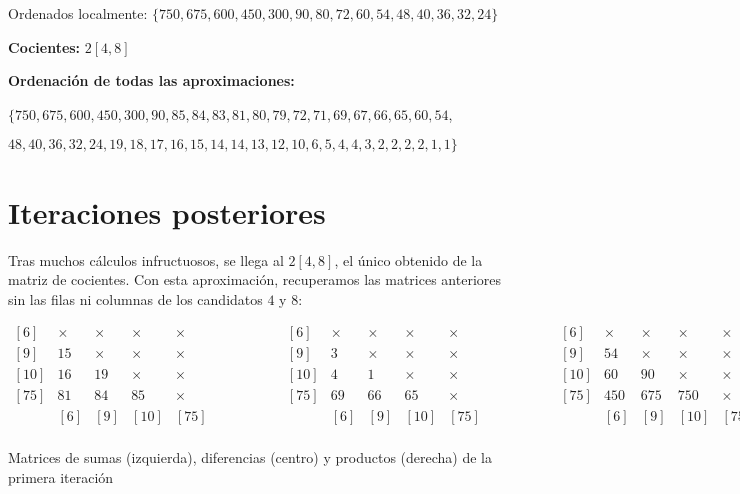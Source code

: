 Ordenados localmente: $\{750,675,600,450,300,90,80,72,60,54,48,40,36,32,24\}$

\textbf{Cocientes:} $2[4,8]$

\textbf{Ordenación de todas las aproximaciones:}

\begin{center}
$\{750,675,600,450,300,90,85,84,83,81,80,79,72,71,69,67,66,65,60,54$,

$48,40,36,32,24,19,18,17,16,15,14,14,13,12,10,6,5,4,4,3,2,2,2,2,1,1\}$
\end{center}

\section{Iteraciones posteriores}

Tras muchos cálculos infructuosos, se llega al  $2[4,8]$, el único  obtenido de la matriz de cocientes.
Con esta aproximación, recuperamos las matrices anteriores sin las filas ni columnas de los candidatos $4$ y $8$:

\begin{center}
$\begin{matrix}
[6]  & \times & \times & \times & \times \\
[9]  & 15     & \times & \times & \times \\
[10] & 16     & 19     & \times & \times \\
[75] & 81     & 84     & 85     & \times \\
     &   [6]  &   [9]  &  [10]  &  [75]  \\
\end{matrix}
\ \ \ \ \ \ \ \ \ \ \ \ \ \ \ \ \ \ \ \ \ \ \begin{matrix}
[6]  & \times & \times & \times & \times \\
[9]  & 3      & \times & \times & \times \\
[10] & 4      & 1      & \times & \times \\
[75] & 69     & 66     & 65     & \times \\
     &   [6]  &   [9]  &  [10]  &  [75]  \\
\end{matrix}
\ \ \ \ \ \ \ \ \ \ \ \ \ \ \ \ \ \ \ \ \ \ \begin{matrix}
[6]  & \times & \times & \times & \times \\
[9]  & 54     & \times & \times & \times \\
[10] & 60     & 90     & \times & \times \\
[75] & 450    & 675    & 750    & \times \\
     &   [6]  &   [9]  &  [10]  &  [75]  \\
\end{matrix}$

Matrices de sumas (izquierda), diferencias (centro) y productos (derecha) de la primera iteración
\end{center}

